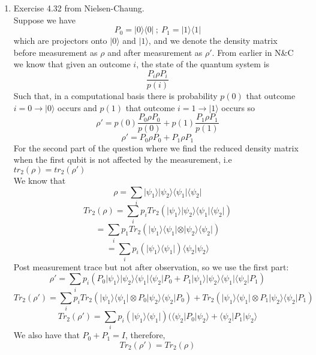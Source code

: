 \documentclass[12pt]{article}
\newcommand{\ket}[1]{\vert{#1}\rangle}
\newcommand{\bra}[1]{\langle{#1}\vert}
\begin{document}
\begin{enumerate}
\begin{enumerate}
    \end{enumerate}
    \item Exercise 4.32 from Nielsen-Chaung. 
    \\
    Suppose we have 
    $$ P_0 = \ket{0} \bra{0} \ ; \ P_1 = \ket{1} \bra{1} $$
    which are projectors onto $\ket{0}$ and $\ket{1}$, and we denote the density matrix before measurement as $\rho$ and after measurement as $\rho'$. From earlier in N\&C we know that given an outcome $i$, the state of the quantum system is 
    $$ \frac{P_i \rho P_i}{p(i)} $$
    Such that, in a computational basis there is probability $p(0)$ that outcome $i=0 \rightarrow \ket{0}$ occurs and $p(1)$ that outcome $i=1 \rightarrow \ket{1}$ occurs so 
    $$ \rho ' = p(0) \frac{P_0 \rho P_0}{p(0)} + p(1) \frac{P_1 \rho P_1}{p(1)} $$
    $$ \rho ' = P_0 \rho P_0 + P_1 \rho P_1 $$
    For the second part of the question where we find the reduced density matrix when the first qubit is not affected by the measurement, i.e $tr_2 (\rho) = tr_2 (\rho')$\\
    We know that 
    $$ \rho = \sum_i \ket{\psi_1} \ket{\psi_2} \bra{\psi_1} \bra{\psi_2} $$
    $$ Tr_2 (\rho) = \sum_i p_i Tr_2 ( \ket{\psi_1} \ket{\psi_2} \bra{\psi_1} \bra{\psi_2}) $$
    $$ = \sum_i p_1 Tr_2 ( \ket{\psi_1} \bra{\psi_1} \otimes \ket{\psi_2} \bra{\psi_2}) $$
    $$ = \sum_i p_i ( \ket{\psi_1}\bra{\psi_1}) \langle \psi_2 | \psi_2 \rangle $$
    Post measurement trace but not after observation, so we use the first part:
    $$ \rho ' = \sum_i p_i (P_0 \ket{\psi_1} \ket{\psi_2} \bra{\psi_1} \bra{\psi_2} P_0 + P_1 \ket{\psi_1} \ket{\psi_2} \bra{\psi_1} \bra{\psi_2} P_1 ) $$
    $$ Tr_2 (\rho ') = \sum_i p_i Tr_2 ( \ket{\psi_1} \bra{\psi_1} \otimes P_0 \ket{\psi_2} \bra{\psi_2} P_0) + Tr_2(\ket{\psi_1} \bra{\psi_1} \otimes P_1 \ket{\psi_2} \bra{\psi_2} P_1) $$
    $$ Tr_2 (\rho ') = \sum_i p_i (\ket{\psi_1} \bra{\psi_1}) ( \langle \psi_2 | P_0 | \psi_2 \rangle + \langle \psi_2 | P_1 | \psi_2 \rangle $$ 
    We also have that $P_0 + P_1 = I$, therefore, 
    $$ Tr_2( \rho ') = Tr_2 (\rho) $$


\end{enumerate}
\end{document}
